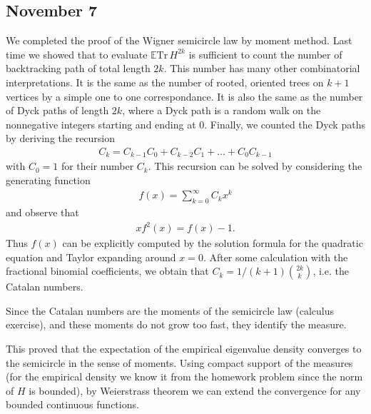 \documentclass[letterpaper,10pt,english]{sphinxhowto}
\begin{document}
\subsection{November 7}
\label{\detokenize{teaching/random_matrices_2017:november-7}}
\sphinxAtStartPar
We completed the proof of the Wigner semicircle law by moment method. Last time we showed that to evaluate \(\mathbb E \text{Tr}\, H^{2k}\) is sufficient to count the number of backtracking path of total length \(2k\). This number has many other combinatorial interpretations. It is the same as the number of rooted, oriented trees on \(k+1\) vertices by a simple one to one correspondance. It is also the same as the number of Dyck paths of length \(2k\), where a Dyck path is a random walk on the nonnegative integers starting and ending at \(0\). Finally, we counted the Dyck paths by deriving the recursion
\begin{equation*}
\begin{split}
C_k = C_{k-1} C_0 + C_{k-2} C_1 + … + C_0 C_{k-1}
\end{split}
\end{equation*}
\sphinxAtStartPar
with \(C_0=1\) for their number \(C_k\). This recursion can be solved by considering the generating
function
\begin{equation*}
\begin{split}
f(x) = \sum_{k=0}^\infty C_k x^k
\end{split}
\end{equation*}
\sphinxAtStartPar
and observe that
\begin{equation*}
\begin{split}
xf^2(x) = f(x) - 1.
\end{split}
\end{equation*}
\sphinxAtStartPar
Thus \(f(x)\) can be explicitly computed by the solution formula for the quadratic equation and Taylor expanding around \(x=0\). After some calculation with the fractional binomial coefficients, we obtain that \(C_k = 1/(k+1) {2k \choose k}\), i.e. the Catalan numbers.

\sphinxAtStartPar
Since the Catalan numbers are the moments of the semicircle law (calculus exercise), and these moments do not grow too fast, they identify the measure.

\sphinxAtStartPar
This proved that the expectation of the empirical eigenvalue density converges to the semicircle in the sense of moments. Using compact support of the measures (for the empirical density we know it from the homework problem since the norm of \(H\) is bounded), by Weierstrass theorem we can extend the
convergence for any bounded continuous functions.
\end{document}
